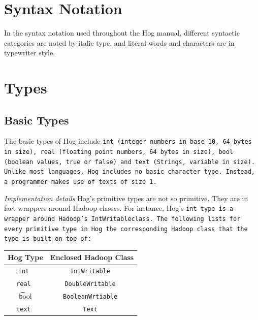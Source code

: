 \documentclass{article}
\begin{document}

\section{Syntax Notation} %
\label{sec:syntax_notation}

In the syntax notation used throughout the Hog manual, different syntactic
categories are noted by italic type, and literal words and characters are in
typewriter style.


\section{Types} %
\label{sec:types}

\subsection{Basic Types} %
\label{sub:basic_types}

The basic types of Hog include \tt int \rm (integer numbers in base 10, 64 bytes
in size), \tt real \rm (floating point numbers, 64 bytes in size), \tt bool
\rm(boolean values, true or false) and \tt text \rm (Strings, variable in size).
Unlike most languages, Hog includes no basic character type. Instead, a programmer
makes use of \tt text\rm s of size 1.

\emph{Implementation details} Hog’s primitive types are not so primitive. They are
in fact wrappers around Hadoop classes. For instance, Hog’s \tt int \rm type is a
wrapper around Hadoop's \tt IntWritableclass\rm. The following lists for every
primitive type in Hog the corresponding Hadoop class that the type is built on top
of:

\begin{center}
\begin{tabular}{|c|c|}
    \hline
\textbf{Hog Type} & \textbf{Enclosed Hadoop Class} \\ \hline
\tt int & \tt IntWritable \\ \hline
\tt real & \tt DoubleWritable \\ \hline
\t bool & \tt BooleanWrtiable \\ \hline
\tt text & \tt Text \rm \\ \hline
\end{tabular}
\end{center}

\end{document}
